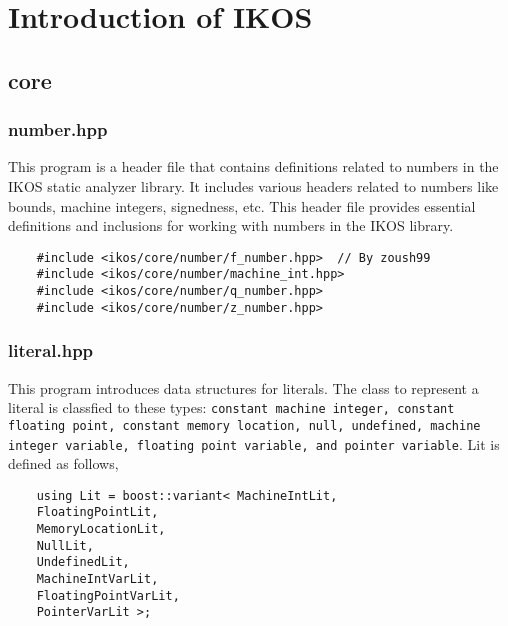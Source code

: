 \documentclass[12pt]{article}
\begin{document}
 
%

\rhead{\today}
 

\section{Introduction of IKOS}

\subsection{core}

\subsubsection{number.hpp}
This program is a header file that contains definitions related to numbers in the IKOS static analyzer library. It includes various headers related to numbers like bounds, machine integers, signedness, etc. This header file provides essential definitions and inclusions for working with numbers in the IKOS library.

\begin{lstlisting}
    #include <ikos/core/number/f_number.hpp>  // By zoush99
    #include <ikos/core/number/machine_int.hpp>
    #include <ikos/core/number/q_number.hpp>
    #include <ikos/core/number/z_number.hpp>
\end{lstlisting} 

\subsubsection{literal.hpp}
This program introduces  data structures for literals. The class to represent a literal is classfied to these types: \texttt{constant machine integer, constant floating point, constant memory location, null, undefined, machine integer variable, floating point variable, and pointer variable}. Lit is defined as follows,
\begin{lstlisting}
    using Lit = boost::variant< MachineIntLit,
    FloatingPointLit,
    MemoryLocationLit,
    NullLit,
    UndefinedLit,
    MachineIntVarLit,
    FloatingPointVarLit,
    PointerVarLit >;
\end{lstlisting}
\end{document}
